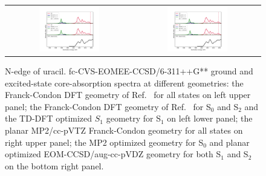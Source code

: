 \documentclass[journal=jctcce,manuscript=article]{achemso}
\begin{document}
\begin{figure}[H]
\caption{N-edge of uracil. fc-CVS-EOMEE-CCSD/6-311++G** ground and excited-state core-absorption spectra at different geometries: 
the Franck-Condon DFT geometry of Ref.~ for all states
on left upper panel; the Franck-Condon DFT geometry of Ref.~  for S$_0$ and S$_2$ and the TD-DFT 
optimized $S_1$ geometry for S$_1$ on left lower panel;  
the planar MP2/cc-pVTZ Franck-Condon geometry for all states
on right upper panel; the MP2 optimized geometry for S$_0$ and
planar optimized EOM-CCSD/aug-cc-pVDZ geometry for both S$_1$ and S$_2$ 
on the bottom right panel.
\label{fgr:uracil:trnexafs_uracil_n}}
\begin{tabular}{cc}
\hspace{-3mm}
\includegraphics[width=0.5\textwidth]{Spectra/DFT_Uracil_Sn_N_zoom.pdf} 
&
\includegraphics[width=0.5\textwidth]{Spectra/MP2_Uracil_Sn_N_zoom.pdf}
\\
\end{tabular}
\end{figure}


\end{document}
